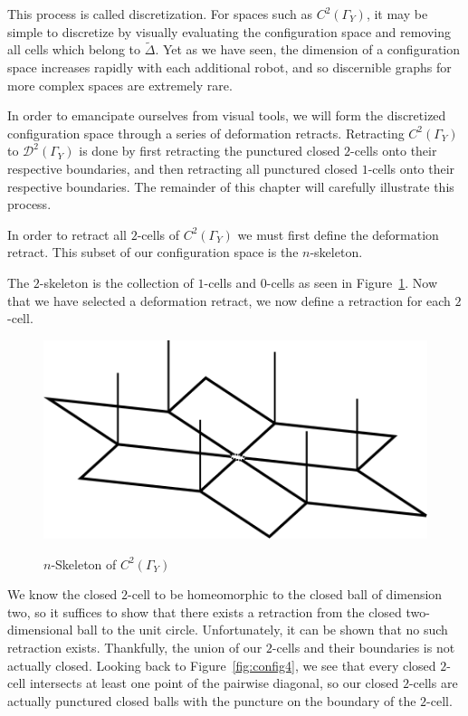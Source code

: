 \documentclass[12pt,oneside]{amsbook}
\newcommand{\Y}{\Gamma_Y}
\begin{document}
This process is called discretization. For spaces such as $C^2(\Y)$, it may be simple to discretize by visually evaluating the configuration space and removing all cells which belong to $\tilde{\Delta}$. Yet as we have seen, the dimension of a configuration space increases rapidly with each additional robot, and so discernible graphs for more complex spaces are extremely rare. 

In order to emancipate ourselves from visual tools, we will form the discretized configuration space through a series of deformation retracts. Retracting $C^2(\Y)$ to $\mathcal{D}^2(\Y)$ is done by first retracting the punctured closed $2$-cells onto their respective boundaries, and then retracting all punctured closed $1$-cells onto their respective boundaries. The remainder of this chapter will carefully illustrate this process.

In order to retract all $2$-cells of $C^2(\Y)$ we must first define the deformation retract. This subset of our configuration space is the $n$-skeleton.

The $2$-skeleton is the collection of $1$-cells and $0$-cells as seen in Figure~\ref{fig:noint}. Now that we have selected a deformation retract, we now define a retraction for each $2$-cell. 

\begin{figure}[h]
\centering
\caption{$n$-Skeleton of $C^2(\Y)$}
\includegraphics[scale=.5]{NoInt.png}
\label{fig:noint}
\end{figure}


We know the closed $2$-cell to be homeomorphic to the closed ball of dimension two, so it suffices to show that there exists a retraction from the closed two-dimensional ball to the unit circle. Unfortunately, it can be shown that no such retraction exists\cite{retract}. Thankfully, the union of our $2$-cells and their boundaries is not actually closed. Looking back to Figure~\ref{fig:config4}, we see that every closed $2$-cell intersects at least one point of the pairwise diagonal, so our closed $2$-cells are actually punctured closed balls with the puncture on the boundary of the $2$-cell.
\end{document}

